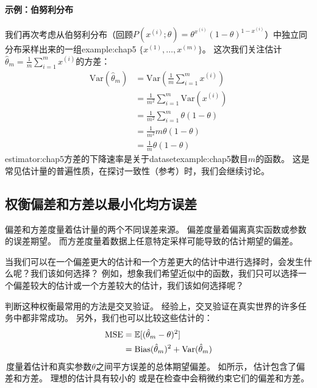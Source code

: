 \paragraph{示例：伯努利分布} 我们再次考虑从伯努利分布（回顾$P(x^{(i)}; \theta) = \theta^{x^{(i)}} (1-\theta)^{1 - x^{(i)}}$）中独立同分布采样出来的一组\gls{example:chap5} $\{ x^{(1)}, \dots, x^{(m)} \}$。
这次我们关注估计$\hat{\theta}_m = \frac{1}{m} \sum_{i=1}^m x^{(i)}$的方差：
\begin{align}
    \text{Var}\left( \hat{\theta}_m \right) &= \text{Var}\left( \frac{1}{m} \sum_{i=1}^m x^{(i)} \right) \\
    &= \frac{1}{m^2} \sum_{i=1}^m \text{Var} \left( x^{(i)} \right) \\
    &= \frac{1}{m^2} \sum_{i=1}^m \theta (1 - \theta) \\
    &= \frac{1}{m^2} m\theta(1-\theta) \\
    &= \frac{1}{m} \theta(1-\theta)
\end{align} 
\gls{estimator:chap5}方差的下降速率是关于\gls{dataset}\gls{example:chap5}数目$m$的函数。
这是常见估计量的普遍性质，在探讨一致性（参考）时，我们会继续讨论。


\subsection{权衡偏差和方差以最小化均方误差}
\label{sec:trading_off_bias_and_variance_to_minimize_mean_squared_error}
偏差和方差度量着估计量的两个不同误差来源。
偏差度量着偏离真实函数或参数的误差期望。
而方差度量着数据上任意特定采样可能导致的估计期望的偏差。

当我们可以在一个偏差更大的估计和一个方差更大的估计中进行选择时，会发生什么呢？我们该如何选择？
例如，想象我们希望近似中的函数，我们只可以选择一个偏差较大的估计或一个方差较大的估计，我们该如何选择呢？

判断这种权衡最常用的方法是交叉验证。
经验上，交叉验证在真实世界的许多任务中都非常成功。
另外，我们也可以比较这些估计的：
\begin{align}
    \text{MSE} &= \mathbb{E}[ ( \hat{\theta}_m - \theta  )^2 ] \\
        &= \text{Bias}( \hat{\theta}_m )^2 + \text{Var}( \hat{\theta}_m ) \label{eq:5.54}
\end{align}
\,度量着估计和真实参数$\theta$之间平方误差的总体期望偏差。
如所示，\,估计包含了偏差和方差。
理想的估计具有较小的\,\,或是在检查中会稍微约束它们的偏差和方差。

